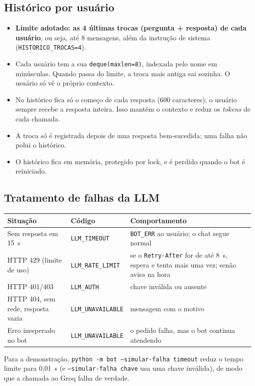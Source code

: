 \documentclass[11pt,a4paper]{article}
\newcommand{\cod}[1]{\texttt{#1}}
\begin{document}
\subsection{Histórico por usuário}\label{sec:historico}
\begin{itemize}
  \item \textbf{Limite adotado: as 4 últimas trocas (pergunta + resposta) de cada usuário}, ou seja,
        até 8 mensagens, além da instrução de sistema (\cod{HISTORICO\_TROCAS=4}).
  \item Cada usuário tem a sua \cod{deque(maxlen=8)}, indexada pelo nome em minúsculas. Quando passa
        do limite, a troca mais antiga sai sozinha. O usuário só vê o próprio contexto.
  \item No histórico fica só o começo de cada resposta (600 caracteres); o usuário sempre recebe a
        resposta inteira. Isso mantém o contexto e reduz os \emph{tokens} de cada chamada.
  \item A troca só é registrada depois de uma resposta bem-sucedida; uma falha não polui o histórico.
  \item O histórico fica em memória, protegido por lock, e é perdido quando o bot é reiniciado.
\end{itemize}

\subsection{Tratamento de falhas da LLM}\label{sec:falhasllm}
\begin{center}
\small
\begin{tabularx}{\linewidth}{l l X}
\toprule
\textbf{Situação} & \textbf{Código} & \textbf{Comportamento} \\
\midrule
Sem resposta em 15~s     & \cod{LLM\_TIMEOUT}     & \cod{BOT\_ERR} ao usuário; o chat segue normal \\
HTTP 429 (limite de uso) & \cod{LLM\_RATE\_LIMIT} & se o \cod{Retry-After} for de até 8~s, espera e tenta mais uma vez;
                                                     senão avisa na hora \\
HTTP 401/403             & \cod{LLM\_AUTH}        & chave inválida ou ausente \\
HTTP 404, sem rede, resposta vazia & \cod{LLM\_UNAVAILABLE} & mensagem com o motivo \\
Erro inesperado no bot   & \cod{LLM\_UNAVAILABLE} & o pedido falha, mas o bot continua atendendo \\
\bottomrule
\end{tabularx}
\end{center}
Para a demonstração, \cod{python -m bot --simular-falha timeout} reduz o tempo limite para 0,01~s
(e \cod{--simular-falha chave} usa uma chave inválida), de modo que a chamada ao Groq falha de verdade.
\end{document}
